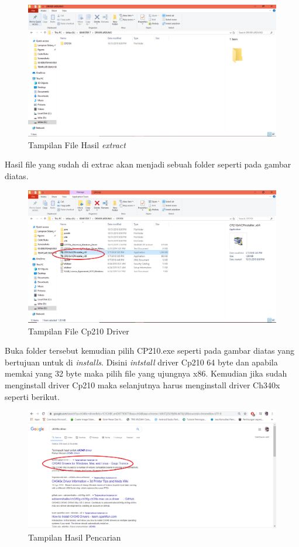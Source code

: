 \begin{figure}[H]
\centering
\includegraphics[width=1\textwidth]{figures/google6.png}
\caption{Tampilan File Hasil \textit{extract} }
\label{print}
\end{figure}
\par Hasil file yang sudah di extrac akan menjadi sebuah folder seperti pada gambar diatas.
\begin{figure}[H]
\centering
\includegraphics[width=1\textwidth]{figures/google7.png}
\caption{Tampilan File Cp210 Driver}
\label{print}
\end{figure}
\par Buka folder tersebut kemudian pilih CP210.exe seperti pada gambar diatas yang bertujuan untuk di \textit{installs}. Disini \textit{intstall} driver Cp210 64 byte dan apabila memkai yang 32 byte maka pilih file yang ujungnya x86. Kemudian  jika sudah menginstall driver Cp210 maka selanjutnya harus menginstall driver Ch340x seperti berikut.
\begin{figure}[H]
\centering
\includegraphics[width=1\textwidth]{figures/google8.png}
\caption{Tampilan Hasil Pencarian }
\label{print}
\end{figure}
